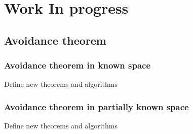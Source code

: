 \chapter{Work In progress}

\section{Avoidance theorem}
\subsection{Avoidance theorem in known space}
Define new theorems and algorithms

\subsection{Avoidance theorem in partially known space}\label{ch:AvoidanceTheoremForPartiallyKnownEnviroment}
Define new theorems and algorithms


